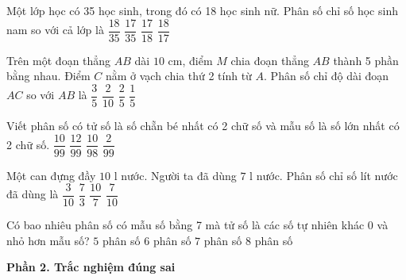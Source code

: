 \begin{ex} %
Một lớp học có 35 học sinh, trong đó có 18 học sinh nữ. Phân số chỉ số học sinh nam so với cả lớp là
\choice
{$\dfrac{18}{35}$}
{\True $\dfrac{17}{35}$}
{$\dfrac{17}{18}$}
{$\dfrac{18}{17}$}
\end{ex}

\begin{ex} %
Trên một đoạn thẳng $AB$ dài $10\text{ cm}$, điểm $M$ chia đoạn thẳng $AB$ thành 5 phần bằng nhau. Điểm $C$ nằm ở vạch chia thứ 2 tính từ $A$. Phân số chỉ độ dài đoạn $AC$ so với $AB$ là
\choice
{$\dfrac{3}{5}$}
{$\dfrac{2}{10}$}
{\True $\dfrac{2}{5}$}
{$\dfrac{1}{5}$}
\end{ex}

\begin{ex} %
Viết phân số có tử số là số chẵn bé nhất có 2 chữ số và mẫu số là số lớn nhất có 2 chữ số.
\choice
{\True $\dfrac{10}{99}$}
{$\dfrac{12}{99}$}
{$\dfrac{10}{98}$}
{$\dfrac{2}{99}$}
\end{ex}

\begin{ex} %
Một can đựng đầy $10\text{ l}$ nước. Người ta đã dùng $7\text{ l}$ nước. Phân số chỉ số lít nước đã dùng là
\choice
{$\dfrac{3}{10}$}
{$\dfrac{7}{3}$}
{$\dfrac{10}{7}$}
{\True $\dfrac{7}{10}$}
\end{ex}

\begin{ex} %
Có bao nhiêu phân số có mẫu số bằng 7 mà tử số là các số tự nhiên khác 0 và nhỏ hơn mẫu số?
\choice
{$5$ phân số}
{\True $6$ phân số}
{$7$ phân số}
{$8$ phân số}
\end{ex}

\textbf{Phần 2. Trắc nghiệm đúng sai}

